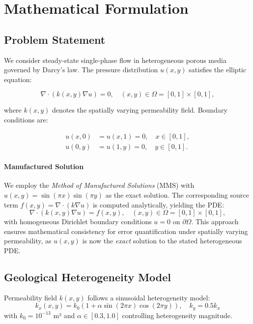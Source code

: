 \documentclass[sn-mathphys]{sn-jnl}
\begin{document}
	\section{Mathematical Formulation}
	\label{sec:formulation}
	
	\subsection{Problem Statement}
	We consider steady-state single-phase flow in heterogeneous porous media governed by Darcy's law. The pressure distribution $u(x,y)$ satisfies the elliptic equation:
	
	\begin{equation}
	\nabla\cdot(k(x,y)\nabla u) = 0, \quad (x,y)\in\Omega=[0,1]\times[0,1],
	\end{equation}
	
	where $k(x,y)$ denotes the spatially varying permeability field. Boundary conditions are:
	
	\begin{align}
	u(x,0) &= u(x,1) = 0, \quad x\in[0,1], \\
	u(0,y) &= u(1,y) = 0, \quad y\in[0,1].
	\end{align}
	
	\paragraph{Manufactured Solution}
	We employ the \emph{Method of Manufactured Solutions} (MMS) with $u(x,y)=\sin(\pi x)\sin(\pi y)$ as the exact solution. The corresponding source term $f(x,y)=\nabla\cdot(k\nabla u)$ is computed analytically, yielding the PDE:
	\begin{equation}
		\nabla\cdot(k(x,y)\nabla u) = f(x,y), \quad (x,y)\in\Omega=[0,1]\times[0,1],
	\end{equation}
	with homogeneous Dirichlet boundary conditions $u=0$ on $\partial\Omega$. This approach ensures mathematical consistency for error quantification under spatially varying permeability, as $u(x,y)$ is now the \emph{exact} solution to the stated heterogeneous PDE.
	
	\subsection{Geological Heterogeneity Model}
	Permeability field $k(x,y)$ follows a sinusoidal heterogeneity model:
	\begin{equation}
	k_x(x,y) = k_0 \left(1 + \alpha \sin(2\pi x)\cos(2\pi y)\right), \quad k_y = 0.5k_x
	\end{equation}
	with $k_0=10^{-13}$ m² and $\alpha \in [0.3, 1.0]$ controlling heterogeneity magnitude.
	
\end{document}
